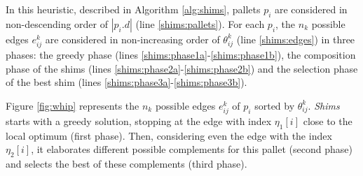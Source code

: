 \documentclass[preprint,authoryear]{elsarticle}
\begin{document}
In this heuristic, described in Algorithm \ref{alg:shims}, pallets $p_i$\/ are considered in non-descending order of $|p_i.d|$ (line \ref{shims:pallets}). For each $p_i$, the $n_k$\/ possible edges $e_{ ij}^k$\/ are considered in non-increasing order of $\theta_{ij}^k$\/ (line \ref{shims:edges}) in three phases: the greedy phase (lines \ref{shims:phase1a}-\ref{shims:phase1b}), the composition phase of the shims (lines \ref{shims:phase2a}-\ref{shims:phase2b}) and the selection phase of the best shim (lines \ref{shims:phase3a}-\ref{shims:phase3b}).

Figure \ref{fig:whip} represents the $n_k$\/ possible edges $e_{ij}^k$\/ of $p_i$\/ sorted by $\theta_{ij}^k$. \emph{Shims}\/ starts with a greedy solution, stopping at the edge with index $\eta_1[i]$ close to the local optimum (first phase). Then, considering even the edge with the index $\eta_2[i]$, it elaborates different possible complements for this pallet (second phase) and selects the best of these complements (third phase).

\end{document}

